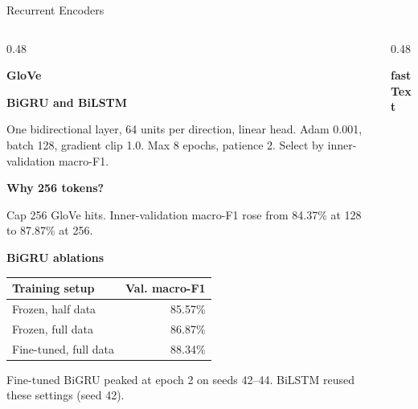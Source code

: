\begin{frame}[t]{Recurrent Encoders}
\begin{columns}[T,onlytextwidth]
\begin{column}{0.48\textwidth}
\raggedright\footnotesize
\textbf{GloVe}\par\smallskip
\textbf{BiGRU and BiLSTM}\par
One bidirectional layer, 64 units per direction, linear head. Adam 0.001, batch 128, gradient clip 1.0. Max 8 epochs, patience 2. Select by inner-validation macro-F1.

\smallskip
\textbf{Why 256 tokens?}\par
Cap 256 GloVe hits. Inner-validation macro-F1 rose from 84.37\% at 128 to 87.87\% at 256.

\smallskip
\textbf{BiGRU ablations}\par
{\scriptsize
\begin{tabular*}{\linewidth}{@{\extracolsep{\fill}}lr@{}}
\hline
Training setup & Val. macro-F1 \\
\hline
Frozen, half data & 85.57\% \\
Frozen, full data & 86.87\% \\
Fine-tuned, full data & 88.34\% \\
\hline
\end{tabular*}\par}
\smallskip
Fine-tuned BiGRU peaked at epoch 2 on seeds 42--44. BiLSTM reused these settings (seed 42).
\end{column}
\begin{column}{0.48\textwidth}
\raggedright\footnotesize\textbf{fastText}\par
\end{column}
\end{columns}
\end{frame}

